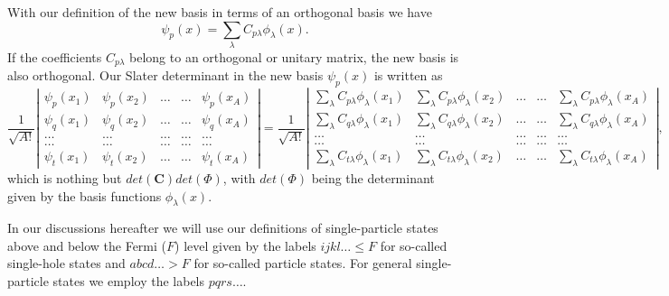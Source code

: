 \documentclass[%
oneside,                 %
final,                   %
10pt]{article}
\begin{document}
With our definition of the new basis in terms of an orthogonal basis we have
\[
\psi_p(x)  = \sum_{\lambda} C_{p\lambda}\phi_{\lambda}(x).
\]
If the coefficients $C_{p\lambda}$ belong to an orthogonal or unitary matrix, the new basis
is also orthogonal. 
Our Slater determinant in the new basis $\psi_p(x)$ is written as
\[
\frac{1}{\sqrt{A!}}
\left| \begin{array}{ccccc} \psi_{p}(x_1)& \psi_{p}(x_2)& \dots & \dots & \psi_{p}(x_A)\\
                            \psi_{q}(x_1)&\psi_{q}(x_2)& \dots & \dots & \psi_{q}(x_A)\\  
                            \dots & \dots & \dots & \dots & \dots \\
                            \dots & \dots & \dots & \dots & \dots \\
                     \psi_{t}(x_1)&\psi_{t}(x_2)& \dots & \dots & \psi_{t}(x_A)\end{array} \right|=\frac{1}{\sqrt{A!}}
\left| \begin{array}{ccccc} \sum_{\lambda} C_{p\lambda}\phi_{\lambda}(x_1)& \sum_{\lambda} C_{p\lambda}\phi_{\lambda}(x_2)& \dots & \dots & \sum_{\lambda} C_{p\lambda}\phi_{\lambda}(x_A)\\
                            \sum_{\lambda} C_{q\lambda}\phi_{\lambda}(x_1)&\sum_{\lambda} C_{q\lambda}\phi_{\lambda}(x_2)& \dots & \dots & \sum_{\lambda} C_{q\lambda}\phi_{\lambda}(x_A)\\  
                            \dots & \dots & \dots & \dots & \dots \\
                            \dots & \dots & \dots & \dots & \dots \\
                     \sum_{\lambda} C_{t\lambda}\phi_{\lambda}(x_1)&\sum_{\lambda} C_{t\lambda}\phi_{\lambda}(x_2)& \dots & \dots & \sum_{\lambda} C_{t\lambda}\phi_{\lambda}(x_A)\end{array} \right|,
\]
which is nothing but $det(\mathbf{C})det(\Phi)$, with $det(\Phi)$ being the determinant given by the basis functions $\phi_{\lambda}(x)$. 

In our discussions hereafter we will use our definitions of single-particle states above and below the Fermi ($F$) level given by the labels
$ijkl\dots \le F$ for so-called single-hole states and $abcd\dots > F$ for so-called particle states.
For general single-particle states we employ the labels $pqrs\dots$. 
\end{document}
